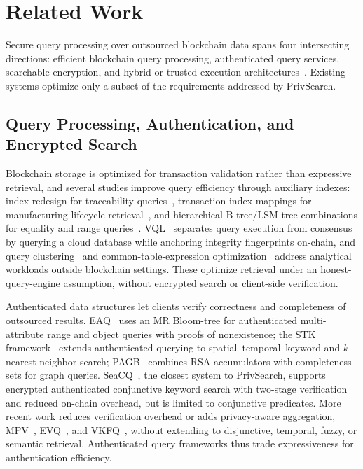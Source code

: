 \documentclass[journal]{IEEEtran}
\theoremstyle{tight}
\theoremstyle{remark}
\theoremstyle{plain}
\begin{document}
 

\section{Related Work}
\label{sec:related}
Secure query processing over outsourced blockchain data spans four intersecting directions: efficient blockchain query processing, authenticated query services, searchable encryption, and hybrid or trusted-execution architectures~\cite{Ailin}. Existing systems optimize only a subset of the requirements addressed by PrivSearch.
 

\subsection{Query Processing, Authentication, and Encrypted Search}
\label{2A}
 
Blockchain storage is optimized for transaction validation rather than expressive retrieval, and several studies improve query efficiency through auxiliary indexes: index redesign for traceability queries~\cite{Lai}, transaction-index mappings for manufacturing lifecycle retrieval~\cite{Hu}, and hierarchical B-tree/LSM-tree combinations for equality and range queries~\cite{Lee}. VQL~\cite{WuHaotianPeng} separates query execution from consensus by querying a cloud database while anchoring integrity fingerprints on-chain, and query clustering~\cite{Lin} and common-table-expression optimization~\cite{Harris} address analytical workloads outside blockchain settings. These optimize retrieval under an honest-query-engine assumption, without encrypted search or client-side verification.
 
Authenticated data structures let clients verify correctness and completeness of outsourced results. EAQ~\cite{Yin} uses an MR Bloom-tree for authenticated multi-attribute range and object queries with proofs of nonexistence; the STK framework~\cite{Xu} extends authenticated querying to spatial--temporal--keyword and $k$-nearest-neighbor search; PAGB~\cite{Wu} combines RSA accumulators with completeness sets for graph queries. SeaCQ~\cite{Yang}, the closest system to PrivSearch, supports encrypted authenticated conjunctive keyword search with two-stage verification and reduced on-chain overhead, but is limited to conjunctive predicates. More recent work reduces verification overhead or adds privacy-aware aggregation, MPV~\cite{Liu}, EVQ~\cite{Chen}, and VKFQ~\cite{Youlin}, without extending to disjunctive, temporal, fuzzy, or semantic retrieval. Authenticated query frameworks thus trade expressiveness for authentication efficiency.
 
\end{document}

